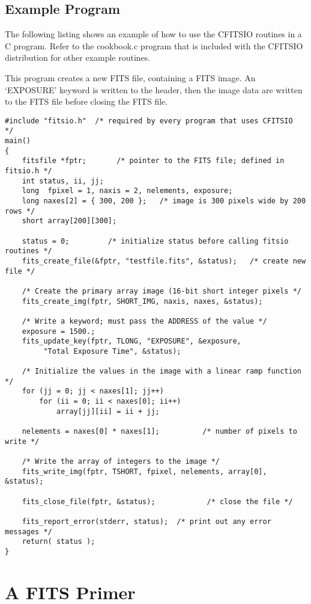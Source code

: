 \documentclass[11pt]{book}
\begin{document}
\section{Example Program}

The following listing shows an example of how to use the CFITSIO
routines in a C program.    Refer to the cookbook.c program that is
included with the CFITSIO distribution for other example routines.

This program creates a new FITS file, containing a FITS image.  An
`EXPOSURE' keyword is written to the header, then the image data are
written to the FITS file before closing the FITS file.

\begin{verbatim}
#include "fitsio.h"  /* required by every program that uses CFITSIO  */
main()
{
    fitsfile *fptr;       /* pointer to the FITS file; defined in fitsio.h */
    int status, ii, jj;
    long  fpixel = 1, naxis = 2, nelements, exposure;
    long naxes[2] = { 300, 200 };   /* image is 300 pixels wide by 200 rows */
    short array[200][300];

    status = 0;         /* initialize status before calling fitsio routines */
    fits_create_file(&fptr, "testfile.fits", &status);   /* create new file */

    /* Create the primary array image (16-bit short integer pixels */
    fits_create_img(fptr, SHORT_IMG, naxis, naxes, &status);

    /* Write a keyword; must pass the ADDRESS of the value */
    exposure = 1500.;
    fits_update_key(fptr, TLONG, "EXPOSURE", &exposure,
         "Total Exposure Time", &status);

    /* Initialize the values in the image with a linear ramp function */
    for (jj = 0; jj < naxes[1]; jj++)
        for (ii = 0; ii < naxes[0]; ii++)
            array[jj][ii] = ii + jj;

    nelements = naxes[0] * naxes[1];          /* number of pixels to write */

    /* Write the array of integers to the image */
    fits_write_img(fptr, TSHORT, fpixel, nelements, array[0], &status);

    fits_close_file(fptr, &status);            /* close the file */

    fits_report_error(stderr, status);  /* print out any error messages */
    return( status );
}
\end{verbatim}

\chapter{  A FITS Primer }
\end{document}
